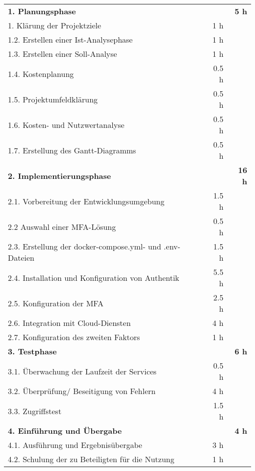\begin{tabularx}{\textwidth}{Xrrr}
\rowcolor{heading}\textbf{1. Planungsphase} & \textbf{} & \textbf{} & \textbf{5 h} \\
1. Klärung der Projektziele &       &   1 h   &  \\
\rowcolor{odd}1.2. Erstellen einer Ist-Analysephase &       &    1 h   &  \\
1.3. Erstellen einer Soll-Analyse &       &    1 h    &  \\
\rowcolor{odd}1.4. Kostenplanung &       &   0.5 h   &  \\
1.5. Projektumfeldklärung &       &    0.5 h   &  \\
\rowcolor{odd}1.6. Kosten- und Nutzwertanalyse &       &    0.5 h   &  \\
1.7. Erstellung des Gantt-Diagramms &        &    0.5 h     &   \\
\rowcolor{heading}\textbf{2. Implementierungsphase} & \textbf{} & \textbf{} & \textbf{16 h} \\
2.1. Vorbereitung der Entwicklungsumgebung &       &    1.5 h   &  \\
\rowcolor{odd}2.2 Auswahl einer MFA-Lösung  &       &    0.5 h   &  \\
2.3. Erstellung der docker-compose.yml- und .env-Dateien &       &   1.5 h    &  \\
\rowcolor{odd}2.4. Installation und Konfiguration von Authentik &      &   5.5 h    &  \\
2.5. Konfiguration der MFA &       &   2.5 h   &  \\
\rowcolor{odd}2.6. Integration mit Cloud-Diensten &     &   4 h    &  \\
2.7. Konfiguration des zweiten Faktors &       &    1 h    &   \\
\rowcolor{heading}\textbf{3. Testphase} & \textbf{} & \textbf{} & \textbf{6 h} \\
3.1. Überwachung der Laufzeit der Services &       &    0.5 h    &  \\
\rowcolor{odd}3.2. Überprüfung/ Beseitigung von Fehlern &       &    4 h   &  \\
3.3. Zugriffstest &        &    1.5 h   &    \\
\rowcolor{heading}\textbf{4. Einführung und Übergabe} & \textbf{} & \textbf{} & \textbf{4 h} \\
4.1. Ausführung und Ergebnisübergabe &       &    3 h   &  \\
\rowcolor{odd}4.2. Schulung der zu Beteiligten für die Nutzung &      &   1 h   &    \\

\end{tabularx}
